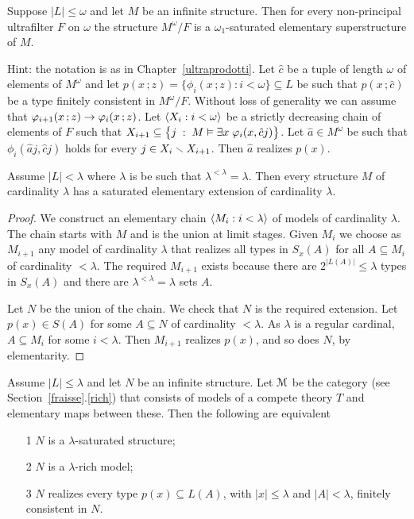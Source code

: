 \documentclass[creche.tex]{subfiles}
\begin{document}
\begin{exercise}
Suppose $|L|\le\omega$ and let $M$ be an infinite structure. Then for every non-principal ultrafilter $F$ on $\omega$ the structure $M^\omega/F$ is a $\omega_1$-saturated elementary superstructure of $M$.

Hint: the notation is as in Chapter~\ref{ultraprodotti}. Let $\hat c$ be a tuple of length $\omega$ of elements of $M^\omega$ and let $p(x\,;z)=\big\{\phi_i(x\,;z):i<\omega\big\}\subseteq L$ be such that $p(x\,;\hat c)$ be a type finitely consistent in $M^\omega/F$. Without loss of generality we can assume that $\varphi_{i+1}(x\,;z)\rightarrow\varphi_i(x\,;z)$. Let $\langle X_i:i<\omega\rangle$ be a strictly decreasing chain of elements of $F$ such that  $X_{i+1}\subseteq\big\{j\;:\;M\vDash\exists x\;\varphi_i(x,\hat cj)\big\}$. Let $\hat a\in M^\omega$ be such that  $\phi_i(\hat aj,\hat cj)$ holds for every $j\in X_i\smallsetminus X_{i+1}$. Then $\hat a$ realizes $p(x)$.\QED
\end{exercise}


\begin{theorem}\label{thm_esistenza_staturo_card_inacc}
Assume $|L|<\lambda$ where $\lambda$ is be such that $\lambda^{<\lambda}=\lambda$. Then every structure $M$ of cardinality $\lambda$ has a saturated elementary extension of cardinality $\lambda$.
\end{theorem}

\begin{proof}
We construct an elementary chain $\langle M_i : i<\lambda\rangle$ of models of cardinality $\lambda$. The chain starts with $M$ and is the union at limit stages. Given $M_i$ we choose as $M_{i+1}$ any model of cardinality $\lambda$ that realizes all types in $S_x(A)$ for all $A\subseteq M_i$ of cardinality $<\lambda$. The required $M_{i+1}$ exists because there are $2^{|L(A)|}\le\lambda$ types in $S_x(A)$ and there are $\lambda^{<\lambda}=\lambda$ sets $A$.

Let $N$ be the union of the chain. We check that $N$ is the required extension. Let $p(x)\in S(A)$ for some $A\subseteq N$ of cardinality $<\lambda$. As $\lambda$ is a regular cardinal,  $A\subseteq M_i$ for some $i<\lambda$. Then $M_{i+1}$ realizes $p(x)$, and so does $N$, by elementarity.
\end{proof}


\begin{theorem}\label{saturo->ricco}
Assume $|L|\le\lambda$ and let $N$ be an infinite structure. Let $\EuScript M$ be the category (see Section~\ref{fraisse}.\ref{rich}) that consists of models of a compete theory $T$ and elementary maps between these. Then the following are equivalent
\begin{itemize}
\item[1] $N$ is a $\lambda$-saturated structure;
\item[2] $N$ is a $\lambda$-rich model;
\item[3] $N$ realizes every type $p(x)\subseteq L(A)$, with $|x|\le\lambda$ and $|A|<\lambda$, finitely consistent in $N$.
\end{itemize}
\end{theorem}
\end{document}
